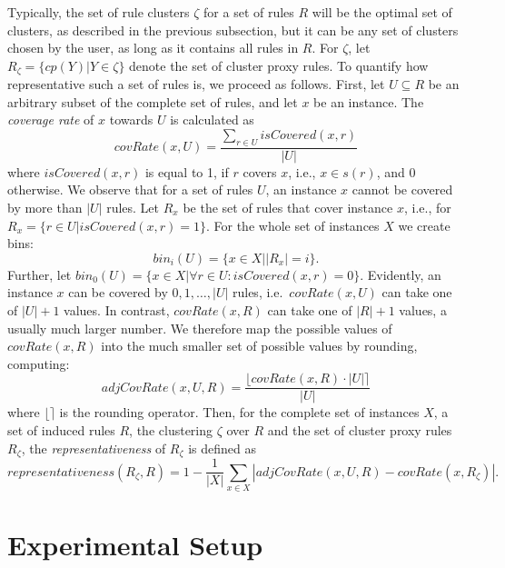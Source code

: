 \documentclass[
  oneside]{book}
\begin{document}
Typically, the set of rule clusters \(\zeta\) for a set of rules \(R\) will be the optimal set of clusters, as described in the previous subsection, but it can be any set of clusters chosen by the user, as long as it contains all rules in \(R\).
For \(\zeta\), let \(R_{\zeta}=\{cp(Y)|Y\in\zeta\}\) denote the set of cluster proxy rules.
To quantify how representative such a set of rules is, we proceed as follows.
First, let \(U\subseteq{}R\) be an arbitrary subset of the complete set of rules, and let \(x\) be an instance.
The \emph{coverage rate} of \(x\) towards \(U\) is calculated as
\begin{equation}
covRate(x,U) = \frac{\sum_{r\in{}U}isCovered(x,r)}{|U|}
\label{eq:covRate}
\end{equation}
where \(isCovered(x,r)\) is equal to 1, if \(r\) covers \(x\), i.e., \(x\in s(r)\), and 0 otherwise.
We observe that for a set of rules \(U\), an instance \(x\) cannot be covered by more than \(|U|\) rules.
Let \(R_x\) be the set of rules that cover instance \(x\), i.e., for \(R_x=\{r\in{}U | isCovered(x,r)=1 \}\).
For the whole set of instances \(X\) we create bins:
\begin{equation}
bin_i(U)= \{x \in{}X | |R_x|=i \}.
\label{eq:bini}
\end{equation}
Further, let \(bin_0(U)= \{x \in{}X | \forall r\in U : isCovered(x,r)=0 \}\).
Evidently, an instance \(x\) can be covered by \(0, 1, \ldots, |U|\) rules, i.e.~\(covRate(x,U)\) can take one of \(|U|+1\) values.
In contrast, \(covRate(x,R)\) can take one of \(|R|+1\) values, a usually much larger number. We therefore map the possible values of \(covRate(x,R)\) into the much smaller set of possible values by rounding, computing:
\begin{equation}
adjCovRate(x,U, R)=\frac{\lfloor covRate(x,R)\cdot|U| \rceil}{|U|}
\label{eq:adjCovRate}
\end{equation}
where \(\lfloor\rceil\) is the rounding operator.
Then, for the complete set of instances \(X\), a set of induced rules \(R\), the clustering \(\zeta\) over \(R\) and the set of cluster proxy rules \(R_{\zeta}\), the \emph{representativeness} of \(R_{\zeta}\) is defined as
\begin{equation}
representativeness(R_{\zeta},R)=1-
\frac{1}{|X|}\sum_{x\in{}X} |adjCovRate(x,U,R) - covRate(x,R_{\zeta})|.
\label{eq:representativeness}
\end{equation}

\hypertarget{sdclu-experiments}{%
\section{Experimental Setup}\label{sdclu-experiments}}
\end{document}
